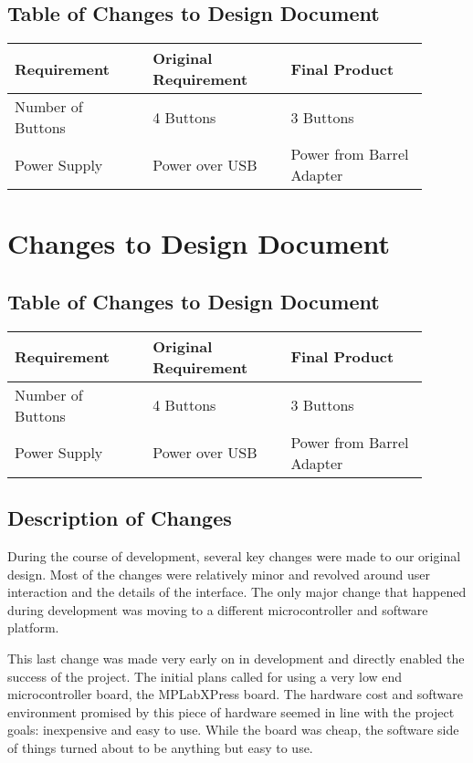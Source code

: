 \documentclass[onecolumn, draftclsnofoot,10pt, compsoc]{IEEEtran}
\begin{document}
\subsection{Table of Changes to Design Document}
\begin{center}
\begin{tabular}{| p{0.3\linewidth} | p{0.3\linewidth} | p{0.3\linewidth} |}
\hline
Requirement &
Original Requirement &
Final Product \\
\hline
Number of Buttons &
4 Buttons &
3 Buttons \\
\hline
Power Supply &
Power over USB &
Power from Barrel Adapter \\
\hline

\end{tabular}
\end{center}

\section{Changes to Design Document}
\subsection{Table of Changes to Design Document}
\begin{center}
\begin{tabular}{| p{0.3\linewidth} | p{0.3\linewidth} | p{0.3\linewidth} |}
\hline
Requirement &
Original Requirement &
Final Product \\
\hline
Number of Buttons &
4 Buttons &
3 Buttons \\
\hline
Power Supply &
Power over USB &
Power from Barrel Adapter \\
\hline

\end{tabular}
\end{center}
\subsection{Description of Changes}
During the course of development, several key changes were made to our original design. Most of the changes were relatively minor and revolved around user interaction and the details of the interface. The only major change that happened during development was moving to a different microcontroller and software platform.

This last change was made very early on in development and directly enabled the success of the project. The initial plans called for using a very low end microcontroller board, the MPLabXPress board. The hardware cost and software environment promised by this piece of hardware seemed in line with the project goals: inexpensive and easy to use. While the board was cheap, the software side of things turned about to be anything but easy to use.
\end{document}
